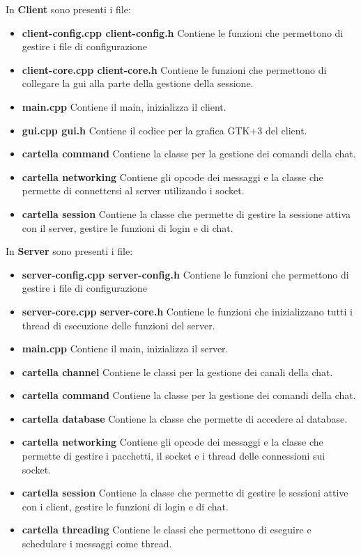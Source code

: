 \documentclass[a4paper,titlepage]{article}
\begin{document}
In \textbf{Client} sono presenti i file:
\begin{itemize}
\item \textbf{client-config.cpp client-config.h} Contiene le funzioni che permettono di gestire i file di configurazione
\item \textbf{client-core.cpp client-core.h} Contiene le funzioni che permettono di collegare la gui alla parte della gestione della sessione.
\item \textbf{main.cpp} Contiene il main, inizializza il client.
\item \textbf{gui.cpp gui.h} Contiene il codice per la grafica GTK+3 del client.
\item \textbf{cartella command} Contiene la classe per la gestione dei comandi della chat.
\item \textbf{cartella networking} Contiene gli opcode dei messaggi e la classe che permette di connettersi al server utilizando i socket.
\item \textbf{cartella session} Contiene la classe che permette di gestire la sessione attiva con il server, gestire le funzioni di login e di chat.
\end{itemize} 

In \textbf{Server} sono presenti i file:
\begin{itemize}
\item \textbf{server-config.cpp server-config.h} Contiene le funzioni che permettono di gestire i file di configurazione
\item \textbf{server-core.cpp server-core.h} Contiene le funzioni che inizializzano tutti i thread di esecuzione delle funzioni del server.
\item \textbf{main.cpp} Contiene il main, inizializza il server. 
\item \textbf{cartella channel} Contiene le classi per la gestione dei canali della chat.
\item \textbf{cartella command} Contiene la classe per la gestione dei comandi della chat.
\item \textbf{cartella database} Contiene la classe che permette di accedere al database.
\item \textbf{cartella networking} Contiene gli opcode dei messaggi e la classe che permette di gestire i pacchetti, il socket e i thread delle connessioni sui socket.
\item \textbf{cartella session} Contiene la classe che permette di gestire le sessioni attive con i client, gestire le funzioni di login e di chat.
\item \textbf{cartella threading} Contiene le classi che permettono di eseguire e schedulare i messaggi come thread.
\end{itemize}
\end{document}
